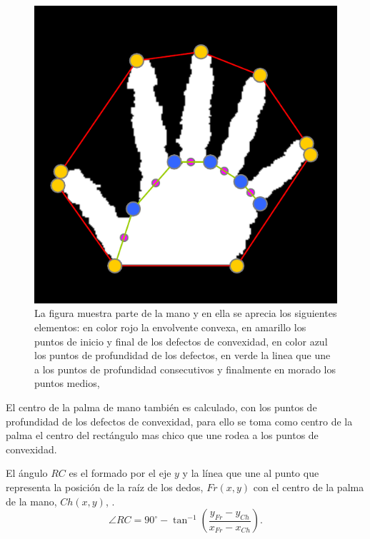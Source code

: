 \begin{figure}[h!]
\begin{center}
\includegraphics[scale=.55]{./Figures/rootFingers.png}
\end{center}
\caption{La figura muestra parte de la mano y en ella se aprecia los siguientes elementos: en color rojo la envolvente convexa, en amarillo los puntos de inicio y final de los defectos de convexidad,  en color azul los puntos de profundidad de los defectos, en verde la linea que une a los puntos de profundidad consecutivos y finalmente en morado los puntos medios, \citep{Hummel2014}} 
\label{fig:RootFingers}
\end{figure} 

El centro de la palma de mano también es calculado, con los puntos de profundidad de los defectos de convexidad, para ello se toma como centro de la palma el centro del rectángulo mas chico que une rodea a los puntos de convexidad. 

El ángulo $RC$ es el formado por el eje $y$  y la línea que une al punto que representa la posición de la raíz de los dedos, $Fr(x,y)$ con el centro de la palma de la mano, $Ch(x,y)$, \citep{Sgouropoulos2014}. 
\begin{equation}
\angle RC = 90^\circ - \tan^{-1} \left( \frac{ y_{Fr}-y_{Ch} }{ x_{Fr}-x_{Ch} } \right).
\end{equation}


